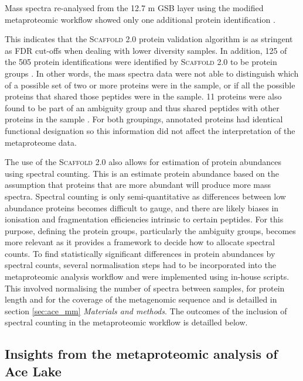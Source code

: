 Mass spectra re-analysed from the 12.7 m \ac{GSB} layer using the modified metaproteomic workflow showed only one additional protein identification .

This indicates that the \textsc{Scaffold} 2.0 protein validation algorithm is as stringent as \ac{FDR} cut-offs when dealing with lower diversity samples.
In addition, 125 of the 505 protein identifications were identified by \textsc{Scaffold} 2.0 to be protein groups .
In other words, the mass spectra data were not able to distinguish which of a possible set of two or more proteins were in the sample, or if all the possible proteins that shared those peptides were in the sample.
11 proteins were also found to be part of an ambiguity group and thus shared peptides with other proteins in the sample .
For both groupings, annotated proteins had identical functional designation so this information did not affect the interpretation of the metaproteome data.

The use of the \textsc{Scaffold} 2.0 also allows for estimation of protein abundances using spectral counting.
This is an estimate protein abundance based on the assumption that proteins that are more abundant will produce more mass spectra.
Spectral counting is only semi-quantitative as differences between low abundance proteins becomes difficult to gauge, and there are likely biases in ionisation and fragmentation efficiencies intrinsic to certain peptides.
For this purpose, defining the protein groups, particularly the ambiguity groups, becomes more relevant as it provides a framework to decide how to allocate spectral counts. 
To find statistically significant differences in protein abundances by spectral counts, several normalisation steps had to be incorporated into the metaproteomic analysis workflow and were implemented using in-house scripts.
This involved normalising the number of spectra between samples, for protein length and for the coverage of the metagenomic sequence and is detailled in section \ref{sec:ace_mm} \emph{Materials and methods}.
The outcomes of the inclusion of spectral counting in the metaproteomic workflow is detailled below.

\subsection[Insights from the metaproteomic analysis of Ace Lake]{Insights from the metaproteomic analysis of Ace Lake}

